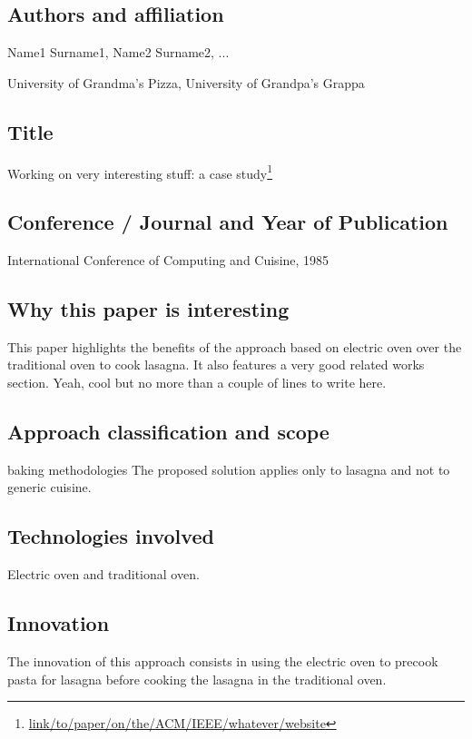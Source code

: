 \subsection*{Authors and affiliation}
Name1 Surname1, Name2 Surname2, ...

University of Grandma's Pizza, University of Grandpa's Grappa

\subsection*{Title}
Working on very interesting stuff: a case study\footnote{\url{link/to/paper/on/the/ACM/IEEE/whatever/website}}


\subsection*{Conference / Journal and Year of Publication}
International Conference of Computing and Cuisine, 1985

\subsection*{Why this paper is interesting}
This paper highlights the benefits of the approach based on electric oven over the traditional oven to cook lasagna.
It also features a very good related works section. Yeah, cool but no more than a couple of lines to write here.

\subsection*{Approach classification and scope}
baking methodologies
The proposed solution applies only to lasagna and not to generic cuisine.

\subsection*{Technologies involved}
Electric oven and traditional oven.

\subsection*{Innovation}
The innovation of this approach consists in using the electric oven to precook pasta for lasagna before cooking the lasagna in the traditional oven.

